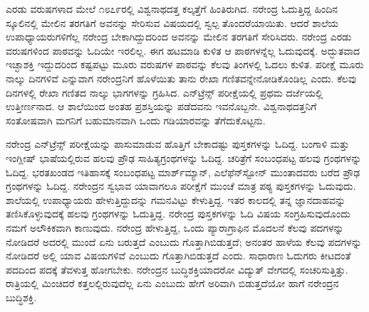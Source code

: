 ಎರಡು ವರುಷಗಳಾದ ಮೇಲೆ ೧೮೭೯ರಲ್ಲಿ ವಿಶ್ವನಾಥದತ್ತ ಕಲ್ಕತ್ತೆಗೆ ಹಿಂತಿರುಗಿದ. ನರೇಂದ್ರ ಓದುತ್ತಿದ್ದ ಹಿಂದಿನ ಸ್ಕೂಲಿನಲ್ಲಿ ಮೇಲಿನ ತರಗತಿಗೆ ಅವನನ್ನು ಸೇರಿಸುವ ವಿಷಯದಲ್ಲಿ ಸ್ವಲ್ಪ ತೊಂದರೆಯಾಯಿತು. ಆದರೆ ಶಾಲೆಯ ಉಪಾಧ್ಯಾಯರುಗಳಿಗೆಲ್ಲ ನರೇಂದ್ರ ಬೇಕಾಗಿದ್ದುದರಿಂದ ಅವನನ್ನು ಮೇಲಿನ ತರಗತಿಗೆ ಸೇರಿಸಿದರು. ನರೇಂದ್ರ ಎರಡು ವರುಷಗಳಿಂದ ಪಾಠವನ್ನು ಓದಿಯೇ ಇರಲಿಲ್ಲ. ಈಗ ಹಟಮಾಡಿ ಕುಳಿತ ಆ ಪಾಠಗಳನ್ನೆಲ್ಲ ಓದುವುದಕ್ಕೆ. ಅದ್ಭುತವಾದ ಇಚ್ಛಾಶಕ್ತಿ ಇದ್ದುದರಿಂದ ಕಷ್ಟಪಟ್ಟು ಮೂರು ವರುಷಗಳ ಪಾಠವನ್ನು ಕೆಲವು ತಿಂಗಳಲ್ಲಿ ಓದಲು ಕುಳಿತ. ಪರೀಕ್ಷೆ ಮೂರು ನಾಲ್ಕು ದಿನಗಳಿವೆ ಎನ್ನುವಾಗ ನರೇಂದ್ರನಿಗೆ ಹೊಳೆಯಿತು ತಾನು ರೇಖಾ ಗಣಿತವನ್ನೇ\break ನೋಡಿಕೊಂಡಿಲ್ಲ ಎಂದು. ಕೆಲವು ದಿನಗಳಲ್ಲಿ ರೇಖಾ ಗಣಿತದ ನಾಲ್ಕು ಭಾಗಗಳನ್ನು ಗ್ರಹಿಸಿದ. ಎನ್‍ಟ್ರೆನ್ಸ್ ಪರೀಕ್ಷೆಯಲ್ಲಿ ಪ್ರಥಮ ದರ್ಜೆಯಲ್ಲಿ ಉತ್ತೀರ್ಣನಾದ. ಆ ಶಾಲೆಯಿಂದ ಅಂತಹ ಪ್ರಶಸ್ತಿಯನ್ನು ಪಡೆದವನು ಇವನೊಬ್ಬನೇ. ವಿಶ್ವನಾಥದತ್ತನಿಗೆ ಸಂತೋಷವಾಗಿ ಮಗನಿಗೆ ಬಹುಮಾನವಾಗಿ ಒಂದು ಗಡಿಯಾರವನ್ನು ತೆಗೆದುಕೊಟ್ಟನು.

ನರೇಂದ್ರ ಎನ್‍ಟ್ರೆನ್ಸ್ ಪರೀಕ್ಷೆಯನ್ನು ಪಾಸುಮಾಡುವ ಹೊತ್ತಿಗೆ ಬೇಕಾದಷ್ಟು ಪುಸ್ತಕಗಳನ್ನು ಓದಿದ್ದ. ಬಂಗಾಳಿ ಮತ್ತು ಇಂಗ್ಲೀಷ್ ಭಾಷೆಯಲ್ಲಿರುವ ಹಲವು ಪ್ರೌಢ ಸಾಹಿತ್ಯಗ್ರಂಥಗಳನ್ನು ಓದಿದ್ದ. ಚರಿತ್ರೆಗೆ ಸಂಬಂಧಪಟ್ಟ ಹಲವು ಗ್ರಂಥಗಳನ್ನು ಓದಿದ್ದ. ಭರತಖಂಡದ ಇತಿಹಾಸಕ್ಕೆ ಸಂಬಂಧಪಟ್ಟ ಮಾರ್ಶ್‍ಮ್ಯಾನ್, ಎಲೆಫೆನ್‍ಸ್ಟೋನ್ ಮುಂತಾದವರು ಬರೆದ ಪ್ರೌಢ ಗ್ರಂಥಗಳನ್ನು ಓದಿದ್ದ. ನರೇಂದ್ರನ ಸ್ವಭಾವ ಯಾವಾಗಲೂ ಪರೀಕ್ಷೆಗೆ ಮುಂಚೆ ಮಾತ್ರ ಪಠ್ಯ ಪುಸ್ತಕಗಳನ್ನು ಓದುವುದು. ಶಾಲೆಯಲ್ಲಿ ಉಪಾಧ್ಯಾಯರು ಹೇಳುತ್ತಿದ್ದುದನ್ನು ಗಮನವಿಟ್ಟು ಕೇಳುತ್ತಿದ್ದ. ಇತರ ಕಾಲದಲ್ಲಿ ತನ್ನ ಜ್ಞಾನದಾಹವನ್ನು ತಣಿಸಿಕೊಳ್ಳುವುದಕ್ಕೆ ಹಲವು ಗ್ರಂಥಗಳನ್ನು ಓದುತ್ತಿದ್ದ. ನರೇಂದ್ರ ಪುಸ್ತಕಗಳನ್ನು ಓದಿ ವಿಷಯ ಸಂಗ್ರಹಿಸುವುದೊಂದು ನಮಗೆ ಅಲೌಕಿಕವಾಗಿ ಕಾಣುವುದು. ನರೇಂದ್ರ ಹೇಳುತ್ತಿದ್ದ, ಒಂದು ಪ್ಯಾರಾಗ್ರಾಫಿನ ಮೊದಲನೆ ಕೆಲವು ಪದಗಳನ್ನು ನೋಡಿದರೆ ಅದರಲ್ಲಿ ಮುಂದೆ ಏನು ಬರುತ್ತದೆ ಎಂಬುದು ಗೊತ್ತಾಗಿಬಿಡುತ್ತದೆ; ಅನಂತರ ಹಾಳೆಯ ಕೆಲವು ಪದಗಳನ್ನು ನೋಡಿದರೆ ಅಲ್ಲಿ ಯಾವ ವಿಷಯಗಳಿವೆ ಎಂಬುದು ಗೊತ್ತಾಗಿಬಿಡುತ್ತದೆ ಎಂದು. ಸಾಧಾರಾಣ ಓದುಗರು ಕೀಟದಂತೆ ಪದದಿಂದ ಪದಕ್ಕೆ ತೆವಳುತ್ತ ಹೋಗಬೇಕು. ನರೇಂದ್ರನ ಬುದ್ಧಿಶಕ್ತಿಯಾದರೋ ವಿದ್ಯುತ್ ವೇಗದಲ್ಲಿ ಸಂಚರಿಸುತ್ತಿತ್ತು. ರಾತ್ರಿಯಲ್ಲಿ ಮಿಂಚಿದರೆ ಕತ್ತಲಲ್ಲಿರುವುದೆಲ್ಲ ಏನು ಎಂಬುದು ಹೇಗೆ ಅರಿವಾಗಿ ಬಿಡುತ್ತದೆಯೋ ಹಾಗೆ ನರೇಂದ್ರನ ಬುದ್ಧಿಶಕ್ತಿ.

